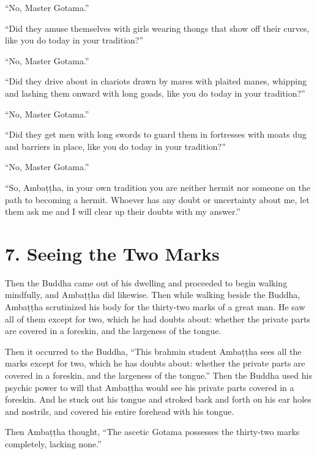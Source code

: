 \documentclass[12pt,openany]{book}%
\begin{document}
“No, Master Gotama.” 

“Did they amuse themselves with girls wearing thongs that show off their curves, like you do today in your tradition?” 

“No, Master Gotama.” 

“Did they drive about in chariots drawn by mares with plaited manes, whipping and lashing them onward with long goads, like you do today in your tradition?” 

“No, Master Gotama.” 

“Did they get men with long swords to guard them in fortresses with moats dug and barriers in place, like you do today in your tradition?” 

“No, Master Gotama.” 

“So, \textsanskrit{Ambaṭṭha}, in your own tradition you are neither hermit nor someone on the path to becoming a hermit. Whoever has any doubt or uncertainty about me, let them ask me and I will clear up their doubts with my answer.” 

\section*{7. Seeing the Two Marks }

Then the Buddha came out of his dwelling and proceeded to begin walking mindfully, and \textsanskrit{Ambaṭṭha} did likewise. Then while walking beside the Buddha, \textsanskrit{Ambaṭṭha} scrutinized his body for the thirty-two marks of a great man. He saw all of them except for two, which he had doubts about: whether the private parts are covered in a foreskin, and the largeness of the tongue. 

Then it occurred to the Buddha, “This brahmin student \textsanskrit{Ambaṭṭha} sees all the marks except for two, which he has doubts about: whether the private parts are covered in a foreskin, and the largeness of the tongue.” Then the Buddha used his psychic power to will that \textsanskrit{Ambaṭṭha} would see his private parts covered in a foreskin. And he stuck out his tongue and stroked back and forth on his ear holes and nostrils, and covered his entire forehead with his tongue. 

Then \textsanskrit{Ambaṭṭha} thought, “The ascetic Gotama possesses the thirty-two marks completely, lacking none.” 
\end{document}
